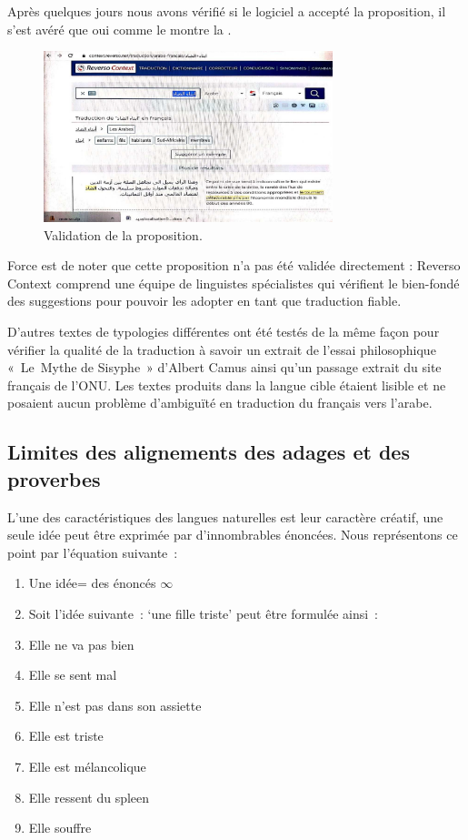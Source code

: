 \documentclass{textolivre}
\begin{document}
Après quelques jours nous avons vérifié si le logiciel a accepté la proposition, il s’est avéré que oui comme le montre la . 

\begin{figure}[htbp]
 \centering
 \includegraphics[width=0.75\textwidth]{figure08.pdf}
 \caption{Validation de la proposition.}
 \label{fig-08}
\end{figure}

Force est de noter que cette proposition n’a pas été validée directement :  Reverso Context comprend une équipe de linguistes spécialistes qui vérifient le bien-fondé des suggestions pour pouvoir les adopter en tant que traduction fiable.

D’autres textes de typologies différentes ont été testés de la même façon pour vérifier la qualité de la traduction à savoir un extrait de l’essai philosophique « Le Mythe de Sisyphe » d’Albert Camus ainsi qu’un passage extrait du site français de l’ONU. Les textes produits dans la langue cible étaient lisible et ne posaient aucun problème d’ambiguïté en traduction du français vers l’arabe. 



\subsection{Limites des alignements des adages et des proverbes}\label{sec-limites}
L’une des caractéristiques des langues naturelles est leur caractère créatif, une seule idée peut être exprimée par d’innombrables énoncées. Nous représentons ce point par l’équation suivante : 

\begin{enumerate}
\item[] Une idée= des énoncés $\infty$
\item[] Soit l’idée suivante :  ‘une fille triste’ peut être formulée ainsi : 
\item Elle ne va pas bien
\item Elle se sent mal
\item Elle n’est pas dans son assiette
\item Elle est triste
\item Elle est mélancolique
\item Elle ressent du spleen
\item Elle souffre
\end{enumerate}
\end{document}
